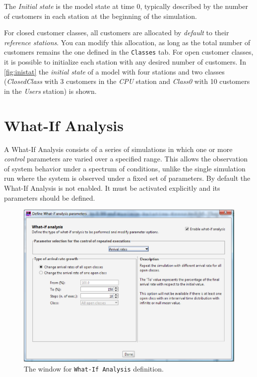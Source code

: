 {\large{}}

The \emph{Initial state} is the model state at time 0, typically
described by the number of customers in each station at the
beginning of the simulation.

For closed customer classes, all customers are allocated by
\emph{default} to their \emph{reference stations}. You can modify
this allocation, as long as the total number of customers remains
the one defined in the \texttt{Classes} tab. For open customer
classes, it is possible to initialize each station with any
desired number of customers. In \autoref{fig:inistat} the
\emph{initial state} of a model with four stations and two classes
(\emph{ClosedClass} with 3 customers in the \emph{CPU} station and
\emph{Class0} with 10 customers in the \emph{Users} station) is
shown.


\section{What-If Analysis}
\label{whaif}

A What-If Analysis consists of a series of simulations in which
one or more \emph{control} parameters are varied over a specified
range. This allows the observation of system behavior under a
spectrum of conditions, unlike the single simulation run where the
system is observed under a fixed set of parameters. By default the
What-If Analysis is not enabled. It must be activated explicitly
and its parameters should be defined.
\begin{figure}[hbt]
    \begin{center}
        \includegraphics[scale=.5]{img/jsimg/7.1.eps}
    \end{center}
    \caption{The window for \texttt{What-If Analysis} definition.}
    \label{fig:iniwhatif}
\end{figure}

